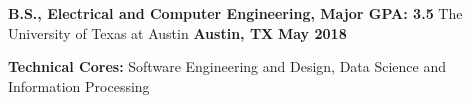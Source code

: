 \begin{cventries}
  \cventry
    {\textbf{\normalsize B.S., Electrical and Computer Engineering, Major GPA: \large 3.5}}
    {\large The University of Texas at Austin}
    {\normalsize \textbf{Austin, TX}}
    {\normalsize \textbf{May 2018}}
    {
        \begin{cvitems}
            \item {\normalsize \textbf{Technical Cores:} Software Engineering and Design, Data Science and Information Processing}
        \end{cvitems}
    }
\end{cventries}
